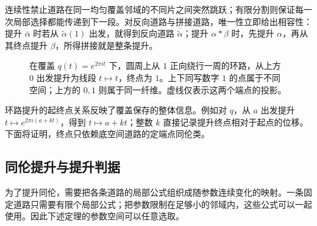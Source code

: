 连续性禁止道路在同一均匀覆盖邻域的不同片之间突然跳跃；有限分割则保证每一次局部选择都能传递到下一段。对反向道路与拼接道路，唯一性立即给出相容性：提升 \(\bar\alpha\) 时若从 \(\widetilde\alpha(1)\) 出发，就得到反向道路 \(\overline{\widetilde\alpha}\)；提升 \(\alpha*\beta\) 时，先提升 \(\alpha\)，再从其终点提升 \(\beta\)，所得拼接就是整条提升。

\begin{figure}[htbp]
	\centering
	
	\caption[圆周环路的非闭提升]{在覆盖 \(q(t)=e^{2\pi it}\) 下，圆周上从 \(1\) 正向绕行一周的环路，从上方 \(0\) 出发提升为线段 \(t\mapsto t\)，终点为 \(1\)。上下同写数字 \(1\) 的点属于不同空间；上方的 \(0,1\) 则属于同一纤维。虚线仅表示这两个端点的投影。}
	\label{g1:fig:path-lift}
\end{figure}

环路提升的起终点关系反映了覆盖保存的整体信息。例如对 \(q\)，从 \(a\) 出发提升 \(t\mapsto e^{2\pi i(a+kt)}\)，得到 \(t\mapsto a+kt\)；整数 \(k\) 直接记录提升终点相对于起点的位移。下面将证明，终点只依赖底空间道路的定端点同伦类。

\subsection{同伦提升与提升判据}
\label{g1:subsec:0503:03}

为了提升同伦，需要把各条道路的局部公式组织成随参数连续变化的映射。一条固定道路只需要有限个局部公式；把参数限制在足够小的邻域内，这些公式可以一起使用。因此下述定理的参数空间可以任意选取。

